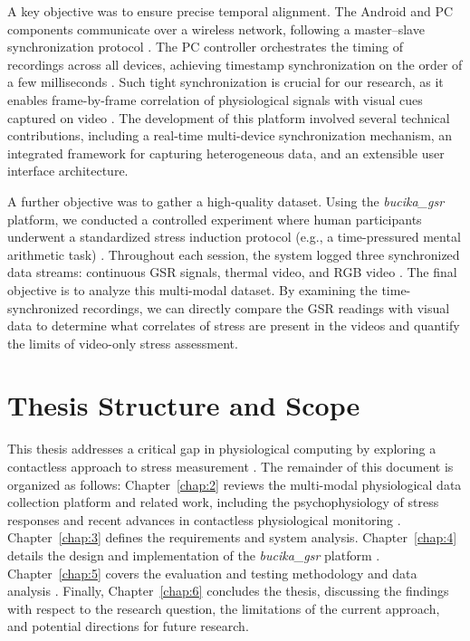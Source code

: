 A key objective was to ensure precise temporal alignment.
The Android and PC components communicate over a wireless network, following a master--slave synchronization protocol
.
The PC controller orchestrates the timing of recordings across all devices, achieving timestamp synchronization on the order of a few milliseconds
.
Such tight synchronization is crucial for our research, as it enables frame-by-frame correlation of physiological signals with visual cues captured on video \cite{Gravina2017}
.
The development of this platform involved several technical contributions, including a real-time multi-device synchronization mechanism, an integrated framework for capturing heterogeneous data, and an extensible user interface architecture.

A further objective was to gather a high-quality dataset.
Using the \textit{bucika\_gsr} platform, we conducted a controlled experiment where human participants underwent a standardized stress induction protocol (e.g., a time-pressured mental arithmetic task)
.
Throughout each session, the system logged three synchronized data streams: continuous GSR signals, thermal video, and RGB video
. The final objective is to analyze this multi-modal dataset.
By examining the time-synchronized recordings, we can directly compare the GSR readings with visual data to determine what correlates of stress are present in the videos and quantify the limits of video-only stress assessment.

\section{Thesis Structure and Scope}

This thesis addresses a critical gap in physiological computing by exploring a contactless approach to stress measurement
.
The remainder of this document is organized as follows: Chapter~\ref{chap:2} reviews the multi-modal physiological data collection platform and related work, including the psychophysiology of stress responses and recent advances in contactless physiological monitoring
. Chapter~\ref{chap:3} defines the requirements and system analysis.
Chapter~\ref{chap:4} details the design and implementation of the \textit{bucika\_gsr} platform
.
Chapter~\ref{chap:5} covers the evaluation and testing methodology and data analysis
.
Finally, Chapter~\ref{chap:6} concludes the thesis, discussing the findings with respect to the research question, the limitations of the current approach, and potential directions for future research.

